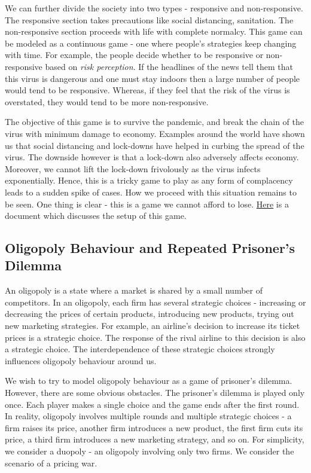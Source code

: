 \documentclass{article}
\theoremstyle{definition}
\begin{document}
We can further divide the society into two types - responsive and non-responsive. The responsive section takes precautions like social distancing, sanitation. The non-responsive section proceeds with life with complete normalcy. This game can be modeled as a continuous game - one where people's strategies keep changing with time. For example, the people decide whether to be responsive or non-responsive based on \textit{risk perception}. If the headlines of the news tell them that this virus is dangerous and one must stay indoors then a large number of people would tend to be responsive. Whereas, if they feel that the risk of the virus is overstated, they would tend to be more non-responsive. \medskip

The objective of this game is to survive the pandemic, and break the chain of the virus with minimum damage to economy. Examples around the world have shown us that social distancing and lock-downs have helped in curbing the spread of the virus. The downside however is that a lock-down also adversely affects economy. Moreover, we cannot lift the lock-down frivolously as the virus infects exponentially. Hence, this is a tricky game to play as any form of complacency leads to a sudden spike of cases. How we proceed with this situation remains to be seen. One thing is clear - this is a game we cannot afford to lose. \href{https://drive.google.com/file/d/1gdy970kVrz_XsAbDqjyGGLMZhqzcWYo8/view?usp=sharing}{Here} is a document which discusses the setup of this game.

\subsection{Oligopoly Behaviour and Repeated Prisoner's Dilemma}

An oligopoly is a state where a market is shared by a small number of competitors. In an oligopoly, each firm has several strategic choices - increasing or decreasing the prices of certain products, introducing new products, trying out new marketing strategies. For example, an airline's decision to increase its ticket prices is a strategic choice. The response of the rival airline to this decision is also a strategic choice. The interdependence of these strategic choices strongly influences oligopoly behaviour around us. \medskip

We wish to try to model oligopoly behaviour as a game of prisoner's dilemma. However, there are some obvious obstacles. The prisoner's dilemma is played only once. Each player makes a single choice and the game ends after the first round. In reality, oligopoly involves multiple rounds and multiple strategic choices - a firm raises its price, another firm introduces a new product, the first firm cuts its price, a third firm introduces a new marketing strategy, and so on. For simplicity, we consider a duopoly - an oligopoly involving only two firms. We consider the scenario of a pricing war.  \medskip
\end{document}

